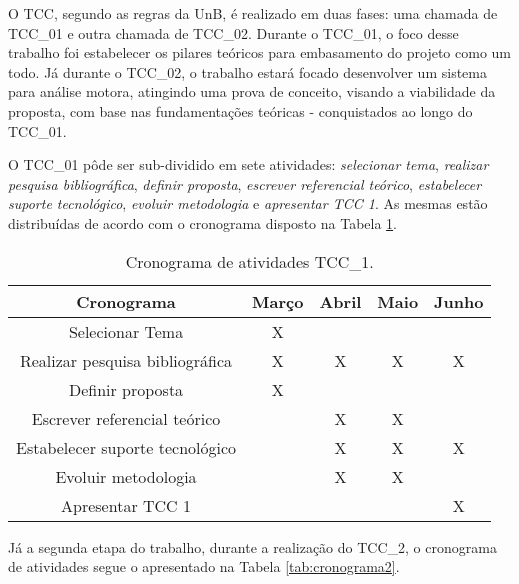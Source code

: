 O TCC, segundo as regras da UnB, é realizado em duas fases: uma chamada de TCC\_01 e outra chamada de TCC\_02.
 Durante o TCC\_01, o foco desse trabalho foi estabelecer os pilares teóricos para embasamento do projeto como um todo.
 Já durante o TCC\_02, o trabalho estará focado desenvolver um sistema para análise motora, atingindo uma prova de conceito,
  visando a viabilidade da proposta, com base nas fundamentações teóricas - conquistados ao longo do TCC\_01.

O TCC\_01 pôde ser sub-dividido em sete atividades: \textit{selecionar tema}, \textit{realizar pesquisa bibliográfica},
 \textit{definir proposta}, \textit{escrever referencial teórico}, \textit{estabelecer suporte tecnológico},
  \textit{evoluir metodologia} e \textit{apresentar TCC 1}.
  As mesmas estão distribuídas de acordo com o cronograma disposto na Tabela \ref{tab:cronograma1}.

\begin{table}[H]
	\centering
	\caption{Cronograma de atividades TCC\_1.}
	\label{tab:cronograma1}
	\begin{tabular}{@{}ccccc@{}}
		\toprule
		\textbf{Cronograma}             & \textbf{Março} & \textbf{Abril} & \textbf{Maio} & \textbf{Junho} \\ \midrule
		Selecionar Tema                 & X              &                &               &                \\ \midrule
		Realizar pesquisa bibliográfica & X              & X              & X             & X              \\ \midrule
		Definir proposta                & X              &                &               &                \\ \midrule
		Escrever referencial teórico    &                & X              & X             &                \\ \midrule
		Estabelecer suporte tecnológico &                & X              & X             & X              \\ \midrule
		Evoluir metodologia             &                & X              & X             &                \\ \midrule
		Apresentar TCC 1                &                &                &               & X              \\ \bottomrule
	\end{tabular}
\end{table}

Já a segunda etapa do trabalho, durante a realização do TCC\_2, o cronograma de atividades segue o apresentado na Tabela \ref{tab:cronograma2}.

